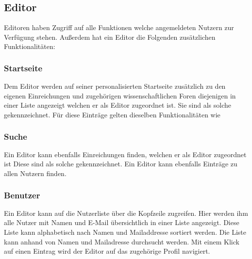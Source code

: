 \subsection{Editor}
Editoren haben Zugriff auf alle Funktionen welche angemeldeten Nutzern zur Verfügung stehen.
Außerdem hat ein Editor die Folgenden zusätzlichen Funktionalitäten:

\subsubsection{Startseite}
\begin{description}
     Dem Editor werden auf seiner personalisierten Startseite zusätzlich zu den eigenen
    Einreichungen und zugehörigen wissenschaftlichen Foren diejenigen in einer
    Liste angezeigt welchen er als Editor zugeordnet ist. Sie sind als solche gekennzeichnet.
    Für diese Einträge gelten dieselben Funktionalitäten wie  %
\end{description}

\subsubsection{Suche}
\begin{description}
     Ein Editor kann ebenfalls Einreichungen finden, welchen er als Editor zugeordnet ist
    Diese sind als solche gekennzeichnet.
     Ein Editor kann ebenfalls Einträge zu allen Nutzern finden.
\end{description}

\subsubsection{Benutzer}
\begin{description}
     Ein Editor kann auf die Nutzerliste über die Kopfzeile zugreifen.
     Hier werden ihm alle Nutzer mit Namen und E-Mail übersichtlich in einer Liste angezeigt.
     Diese Liste kann alphabetisch nach Namen und Mailaddresse sortiert werden.
     Die Liste kann anhand von Namen und Mailadresse durchsucht werden.
     Mit einem Klick auf einen Eintrag wird der Editor auf das zugehörige Profil navigiert.
\end{description}

